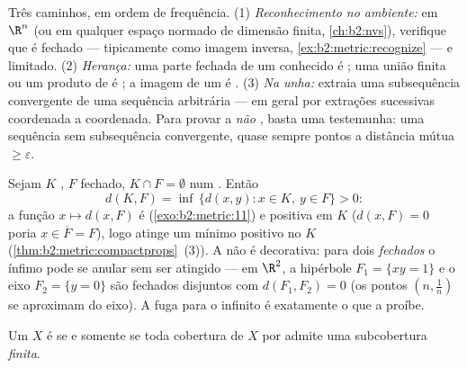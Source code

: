 \begin{method}\label{met:b2:metric:compactness}
Três caminhos, em ordem de frequência. (1) \emph{Reconhecimento
no ambiente:} em $\R^n$ (ou em qualquer espaço normado de
dimensão finita, \cref{ch:b2:nvs}), verifique que é fechado --- tipicamente como
imagem inversa, \cref{ex:b2:metric:recognize} --- e limitado. (2)
\emph{Herança:} uma parte fechada de um  conhecido é
; uma união finita ou um produto de  é ; a
imagem  de um  é . (3) \emph{Na
unha:} extraia uma subsequência convergente de uma sequência
arbitrária --- em geral por extrações sucessivas coordenada a
coordenada. Para provar a \emph{não} , basta uma testemunha:
uma sequência sem subsequência convergente, quase sempre
pontos a distância mútua $\geq \varepsilon$.
\end{method}

\begin{example}\label{ex:b2:metric:setdistance}
Sejam $K$ , $F$ fechado, $K \cap F = \emptyset$ num
. Então
\[
d(K, F) = \inf\,\{d(x, y) : x \in K,\ y \in F\} > 0 :
\]
a função $x \mapsto d(x, F)$ é 
(\cref{exo:b2:metric:11}) e positiva em $K$ ($d(x, F) = 0$
poria $x \in \overline F = F$), logo atinge um mínimo positivo
no  $K$
(\cref{thm:b2:metric:compactprops}~(3)). A  não é
decorativa: para dois \emph{fechados} o ínfimo pode se anular
sem ser atingido --- em $\R^2$, a hipérbole $F_1 = \{xy
= 1\}$ e o eixo $F_2 = \{y = 0\}$ são fechados disjuntos
com $d(F_1, F_2) = 0$ (os pontos $(n, \frac1n)$ se aproximam do
eixo). A fuga para o infinito é exatamente o que a  proíbe.
\end{example}

\begin{theorem}\label{thm:b2:metric:borellebesgue}
Um  $X$ é  se e somente se toda cobertura de $X$ por
 admite uma subcobertura \emph{finita}.
\end{theorem}

